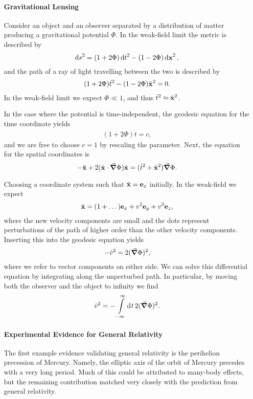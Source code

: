 \paragraph{Gravitational Lensing}
Consider an object and an observer separated by a distribution of matter producing a gravitational potential $\Phi$. In the weak-field limit the metric is described by
\begin{align*}
	\dd{s}^{2} = (1 + 2\Phi)\dd{t}^{2} - (1 - 2\Phi)\dd{\vb{x}}^{2},
\end{align*}
and the path of a ray of light travelling between the two is described by
\begin{align*}
	(1 + 2\Phi)\dot{t}^{2} - (1 - 2\Phi)\dot{\vb{x}}^{2} = 0.
\end{align*}
In the weak-field limit we expect $\Phi \ll 1$, and thus $\dot{t}^{2} \approx \dot{\vb{x}}^{2}$.

In the case where the potential is time-independent, the geodesic equation for the time coordinate yields
\begin{align*}
	(1 + 2\Phi)\dot{t} = c,
\end{align*}
and we are free to choose $c = 1$ by rescaling the parameter. Next, the equation for the spatial coordinates is
\begin{align*}
	-\ddot{\vb{x}} + 2(\dot{\vb{x}}\cdot\grad{\Phi})\dot{\vb{x}} = (\dot{t}^{2} + \dot{\vb{x}}^{2})\grad{\Phi}.
\end{align*}

Choosing a coordinate system such that $\dot{\vb{x}} = \vb{e}_{x}$ initially. In the weak-field we expect
\begin{align*}
	\dot{\vb{x}} = (1 + \dots)\vb{e}_{x} + v^{2}\vb{e}_{y} + v^{3}\vb{e}_{z},
\end{align*}
where the new velocity components are small and the dots represent perturbations of the path of higher order than the other velocity components. Inserting this into the geodesic equation yields
\begin{align*}
	-\dot{v}^{2} = 2(\grad{\Phi})^{2},
\end{align*}
where we refer to vector components on either side. We can solve this differential equation by integrating along the unperturbed path. In particular, by moving both the observer and the object to infinity we find
\begin{align*}
	\dot{v}^{2} = -\int\limits_{-\infty}^{\infty}\dd[]{t}2(\grad{\Phi})^{2}.
\end{align*}

\paragraph{Experimental Evidence for General Relativity}
The first example evidence validating general relativity is the perihelion precession of Mercury. Namely, the elliptic axis of the orbit of Mercury precedes with a very long period. Much of this could be attributed to many-body effects, but the remaining contribution matched very closely with the prediction from general relativity.


